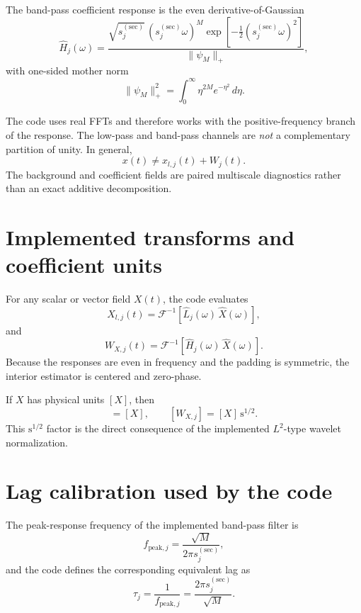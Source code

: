 \documentclass[11pt]{article}
\begin{document}
The band-pass coefficient response is the even derivative-of-Gaussian
\begin{equation}
 \widehat{H}_j(\omega) = \frac{\sqrt{s_j^{(\mathrm{sec})}}\,(s_j^{(\mathrm{sec})}\omega)^M
 \exp\!\left[-\frac{1}{2}(s_j^{(\mathrm{sec})}\omega)^2\right]}{\|\psi_M\|_+},
\end{equation}
with one-sided mother norm
\begin{equation}
 \|\psi_M\|_+^2 = \int_0^{\infty} \eta^{2M} e^{-\eta^2} \, d\eta.
\end{equation}

The code uses real FFTs and therefore works with the positive-frequency branch of
the response. The low-pass and band-pass channels are \emph{not} a complementary
partition of unity. In general,
\begin{equation}
 x(t) \neq x_{l,j}(t) + W_j(t).
\end{equation}
The background and coefficient fields are paired multiscale diagnostics rather than
an exact additive decomposition.

\section{Implemented transforms and coefficient units}

For any scalar or vector field $X(t)$, the code evaluates
\begin{equation}
 X_{l,j}(t) = \mathcal{F}^{-1}\!\left[\widehat{L}_j(\omega)\,\widehat{X}(\omega)\right],
\end{equation}
and
\begin{equation}
 W_{X,j}(t) = \mathcal{F}^{-1}\!\left[\widehat{H}_j(\omega)\,\widehat{X}(\omega)\right].
\end{equation}
Because the responses are even in frequency and the padding is symmetric, the
interior estimator is centered and zero-phase.

If $X$ has physical units $[X]$, then
\begin{equation}
 [X_{l,j}] = [X], \qquad [W_{X,j}] = [X]\,\mathrm{s}^{1/2}.
\end{equation}
This $\mathrm{s}^{1/2}$ factor is the direct consequence of the implemented
$L^2$-type wavelet normalization.

\section{Lag calibration used by the code}

The peak-response frequency of the implemented band-pass filter is
\begin{equation}
 f_{\mathrm{peak},j} = \frac{\sqrt{M}}{2\pi s_j^{(\mathrm{sec})}},
\end{equation}
and the code defines the corresponding equivalent lag as
\begin{equation}
 \tau_j = \frac{1}{f_{\mathrm{peak},j}} = \frac{2\pi s_j^{(\mathrm{sec})}}{\sqrt{M}}.
\end{equation}
\end{document}
